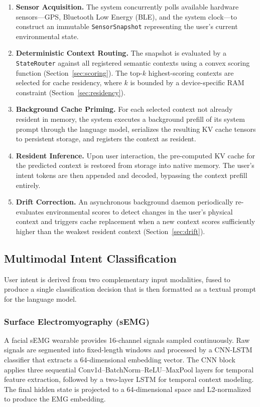 \begin{enumerate}
    \item \textbf{Sensor Acquisition.} The system concurrently polls available hardware sensors---GPS, Bluetooth Low Energy (BLE), and the system clock---to construct an immutable \texttt{SensorSnapshot} representing the user's current environmental state.

    \item \textbf{Deterministic Context Routing.} The snapshot is evaluated by a \texttt{StateRouter} against all registered semantic contexts using a convex scoring function (Section~\ref{sec:scoring}). The top-$k$ highest-scoring contexts are selected for cache residency, where $k$ is bounded by a device-specific RAM constraint (Section~\ref{sec:residency}).

    \item \textbf{Background Cache Priming.} For each selected context not already resident in memory, the system executes a background prefill of its system prompt through the language model, serializes the resulting KV cache tensors to persistent storage, and registers the context as resident.

    \item \textbf{Resident Inference.} Upon user interaction, the pre-computed KV cache for the predicted context is restored from storage into native memory. The user's intent tokens are then appended and decoded, bypassing the context prefill entirely.

    \item \textbf{Drift Correction.} An asynchronous background daemon periodically re-evaluates environmental scores to detect changes in the user's physical context and triggers cache replacement when a new context scores sufficiently higher than the weakest resident context (Section~\ref{sec:drift}).
\end{enumerate}

\subsection{Multimodal Intent Classification}
\label{sec:fusion}

User intent is derived from two complementary input modalities, fused to produce a single classification decision that is then formatted as a textual prompt for the language model.

\subsubsection{Surface Electromyography (sEMG)}
A facial sEMG wearable provides 16-channel signals sampled continuously. Raw signals are segmented into fixed-length windows and processed by a CNN-LSTM classifier that extracts a 64-dimensional embedding vector. The CNN block applies three sequential Conv1d--BatchNorm--ReLU--MaxPool layers for temporal feature extraction, followed by a two-layer LSTM for temporal context modeling. The final hidden state is projected to a 64-dimensional space and L2-normalized to produce the EMG embedding.

